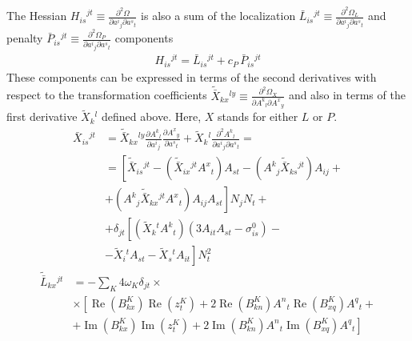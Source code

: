 \documentclass[aps,prl,reprint,amsmath,amssymb]{revtex4-1}
\begin{document}
The Hessian ${H_{is}}^{jt} \equiv \frac{\partial^2 \Omega}{\partial {a^i}_j \partial{a^s}_t}$ is also a sum of the localization $\bar{L}{_{is}}^{jt} \equiv \frac{\partial^2 \Omega_L}{\partial {a^i}_j \partial{a^s}_t}$ and penalty $\bar{P}{_{is}}^{jt} \equiv \frac{\partial^2 \Omega_P}{\partial {a^i}_j \partial{a^s}_t}$ components
%
\begin{equation} \label{eq:hessian}
\begin{split}
H{_{is}}^{jt} = \bar{L}{_{is}}^{jt} + c_P\, \bar{P}{_{is}}^{jt}
\end{split}
\end{equation}
%
These components can be expressed in terms of the second derivatives with respect to the transformation coefficients $\tilde{\bar{X}}{_{kx}}^{ly} \equiv \frac{\partial^2 \Omega_X}{\partial {A^k}_l \partial {A^x}_y}$ and also in terms of the first derivative $\tilde{X}{_k}^l$ defined above. Here, $X$ stands for either $L$ or $P$. %
%
\begin{equation} \label{eq:hessian-convert}
\begin{split}
\bar{X}{_{is}}^{jt} &= \tilde{\bar{X}}{_{kx}}^{ly} \frac{\partial {A^k}_l}{\partial {a^i}_j} \frac{\partial {A^x}_y}{\partial {a^s}_t} + \tilde{X}{_k}^l \frac{\partial^2 {A^k}_l}{\partial {a^i}_j \partial{a^s}_t} = \\
&= \left[ \tilde{\bar{X}}{_{is}}^{jt} - \left(\tilde{\bar{X}}{_{ix}}^{jt} {A^x}_t \right) A_{st} - \left({A^k}_j \tilde{\bar{X}}{_{ks}}^{jt} \right) A_{ij} + \right.\\
&\left. + \left({A^k}_j \tilde{\bar{X}}{_{kx}}^{jt} {A^x}_t\right) A_{ij} A_{st} \right] N_j N_t + \\
&+ \delta_{jt} \left[ \left(\tilde{X}{_k}^t {A^k}_t \right) \left( 3 A_{it} A_{st} - \sigma^0_{is} \right) - \right.\\
&\left.  -\tilde{X}{_i}^t A_{st} - \tilde{X}{_s}^t A_{it} \right] N_{t}^2
\end{split}
\end{equation}
%
%
\begin{equation} \label{eq:hessian-loc}
\begin{split}
\tilde{\bar{L}}{_{kx}}^{jt} &= - \sum_K {4 \omega_K}  \delta_{jt} \times \\ 
&\times \left[  \operatorname{Re}(B^{K}_{kx}) \operatorname{Re}(z_{t}^{K}) + 2 \operatorname{Re}(B^{K}_{kn}){A^{n}}_{t} \operatorname{Re}(B^{K}_{xq}){A^{q}}_{t} +  \right. \\
&\left. + \operatorname{Im}(B^{K}_{kx}) \operatorname{Im}(z_{t}^{K}) + 2 \operatorname{Im}(B^{K}_{kn}){A^{n}}_{t} \operatorname{Im}(B^{K}_{xq}){A^{q}}_{t}  \right]
\end{split}
\end{equation}
\end{document}
